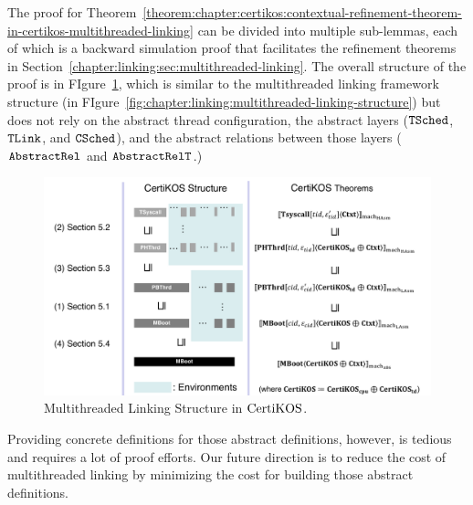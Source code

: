 The proof for Theorem~\ref{theorem:chapter:certikos:contextual-refinement-theorem-in-certikos-multithreaded-linking} 
can be divided into multiple sub-lemmas, each of which is a backward simulation proof 
that facilitates the refinement theorems in Section~\ref{chapter:linking:sec:multithreaded-linking}. 
The overall structure of the proof is in FIgure~\ref{fig:chapter:certikos:multithreaded-connect-proof-overall-structure}, which is 
similar to the multithreaded linking framework structure (in FIgure~\ref{fig:chapter:linking:multithreaded-linking-structure}) but does not rely on
the abstract thread configuration, the abstract layers (${{\mathrm{\texttt{TSched}}}}$, ${{\mathrm{\texttt{TLink}}}}$, and ${{\mathrm{\texttt{CSched}}}}$), and 
the abstract relations between those layers (${\mathrm{\texttt{AbstractRel}}}$ and ${\mathrm{\texttt{AbstractRelT}}}$.)
\begin{figure}
\includegraphics[width=\textwidth, page=3]{figs/certikos/concurrent_linking}
\caption{Multithreaded Linking Structure in $\mathrm{CertiKOS}$.}
\label{fig:chapter:certikos:multithreaded-connect-proof-overall-structure}
\end{figure}
Providing concrete definitions for those abstract definitions, however, is tedious and requires a lot of proof efforts. 
Our future direction is to reduce the cost of multithreaded linking by minimizing the cost for building 
those abstract definitions. 

%



